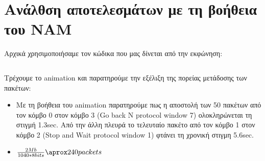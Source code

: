 \documentclass[a4paper,9pt]{article}
\begin{document}
\def\thesection {\Roman{section}.}



\section*{Aνάλθση αποτελεσμάτων με τη βοήθεια του NAM}
Αρχικά χρησιμοποιήσαμε τον κώδικα που μας δίνεται από την εκφώνηση:

\inputminted[fontsize=\footnotesize]{tcl}{files/ex1_1.tcl}


Τρέχουμε το animation και παρατηρούμε την εξέλιξη της πορείας μετάδοσης των
πακέτων:

\begin{itemize}
    \item Με τη βοήθεια του animation παρατηρούμε πως η αποστολή των 50
    πακέτων από τον κόμβο 0 στον κόμβο 3 (Go back N protocol window 7) ολοκληρώνεται τη
    στιγμή 1.3sec. Από την άλλη πλευρά το τελευταίο πακέτο από τον κόμβο 1
    στον κόμβο 2 (Stop and Wait protocol window 1) φτάνει τη χρονική στιγμη
    5.6sec.
    \item $\frac{2Mb}{1040*8bits}\aprox240packets$
\end{itemize}
\end{document}
